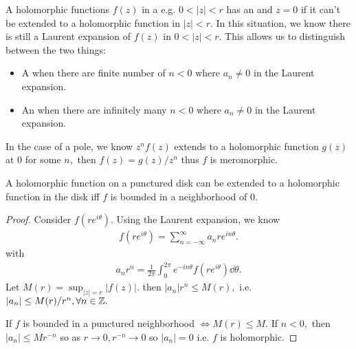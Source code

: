 \documentclass[a4paper,12pt]{article}
\begin{document}
A holomorphic functions $f(z)$ in a  e.g. $0<|z|<r$ has an  and $z=0$ if it can't be extended to a holomorphic function in $|z|<r.$ In this situation, we know there is still a Laurent expansion of $f(z)$ in $0<|z|<r.$ This allows us to distinguish between the two things: \begin{definition}
    \begin{itemize}
        \item A  when there are finite number of $n<0$ where $a_n\neq0$ in the Laurent expansion.
        \item An  when there are infinitely many $n<0$ where $a_n\neq0$ in the Laurent expansion.
    \end{itemize}
\end{definition}
In the case of a pole, we know $z^nf(z)$ extends to a holomorphic function $g(z)$ at $0$ for some $n,$ then $f(z)=g(z)/z^n$ thus $f$ is meromorphic.

\begin{proposition}
    A holomorphic function on a punctured disk can be extended to a holomorphic function in the disk iff $f$ is bounded in a neighborhood of $0.$
    \begin{proof}
        Consider $f(re^{i\theta}).$ Using the Laurent expansion, we know \begin{align}
            f(re^{i\theta})=\sum_{n=-\infty}^\infty a_nre^{in\theta}.
        \end{align}
        with \begin{align}
            a_nr^n=\frac{1}{2\pi}\int_0^{2\pi}e^{-in\theta}f(re^{i\theta})\dd\theta.
        \end{align}
        Let $M(r)=\sup_{|z|=r}|f(z)|.$ then $|a_n|r^n\leq M(r),$ i.e. $|a_n|\leq M(r)/r^n,\forall n\in\mathbb{Z}.$

        If $f$ is bounded in a punctured neighborhood $\iff M(r)\leq M.$ If $n<0,$ then $|a_n|\leq Mr^{-n}$ so as $r\to0,r^{-n}\to 0$ so $|a_n|=0$ i.e. $f$ is holomorphic.
    \end{proof}
\end{proposition}
\end{document}

